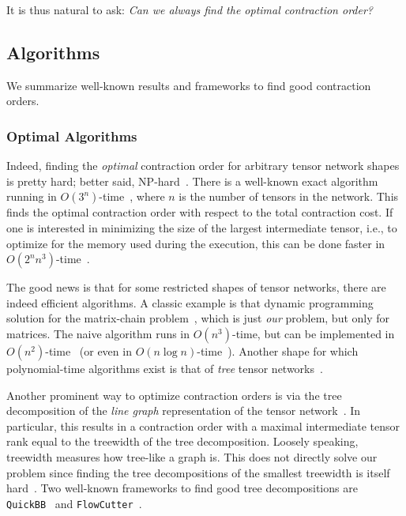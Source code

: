 It is thus natural to ask: \emph{Can we always find the optimal contraction order?}

\subsection{Algorithms}

We summarize well-known results and frameworks to find good contraction orders.

\subsubsection{Optimal Algorithms}

Indeed, finding the \emph{optimal} contraction order for arbitrary tensor network shapes is pretty hard; better said, NP-hard~\cite{ordering_np_hard}. There is a well-known exact algorithm running in $O(3^n)$-time~\cite{ordering_exact_algo}, where $n$ is the number of tensors in the network. This finds the optimal contraction order with respect to the total contraction cost. If one is interested in minimizing the size of the largest intermediate tensor, i.e., to optimize for the memory used during the execution, this can be done faster in $O(2^n n^3)$-time~\cite{dpconv}. 

The good news is that for some restricted shapes of tensor networks, there are indeed efficient algorithms. A classic example is that dynamic programming solution for the matrix-chain problem~\cite{cormen}, which is just \emph{our} problem, but only for matrices. The naive algorithm runs in $O(n^3)$-time, but can be implemented in $O(n^2)$-time~\cite{mc_yao} (or even in $O(n \log n)$-time~\cite{mc_nlogn_1, mc_nlogn_2}). Another shape for which polynomial-time algorithms exist is that of \emph{tree} tensor networks~\cite{ttn_size, ttn_cost}.

Another prominent way to optimize contraction orders is via the tree decomposition of the \emph{line graph} representation of the tensor network~\cite{markov_shi, dudek_tree_decomp, roman_tree_decomp}. In particular, this results in a contraction order with a maximal intermediate tensor rank equal to the treewidth of the tree decomposition. Loosely speaking, treewidth measures how tree-like a graph is. This does not directly solve our problem since finding the tree decompositions of the smallest treewidth is itself hard~\cite{treewidth_approx}. Two well-known frameworks to find good tree decompositions are \texttt{QuickBB}~\cite{quick_bb} and \texttt{FlowCutter}~\cite{flow_cutter_1, flow_cutter_2}.


